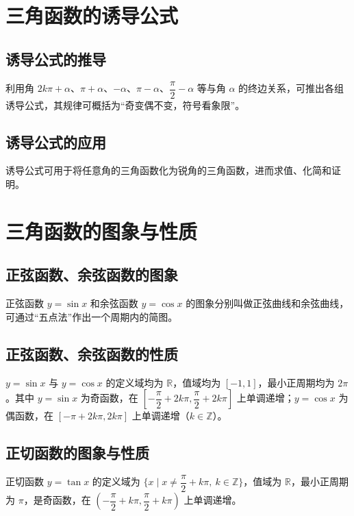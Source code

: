 \documentclass[lang=cn,newtx,10pt,scheme=chinese,nofont]{elegantbook}
\begin{document}
\section{三角函数的诱导公式}
\subsection{诱导公式的推导}
\begin{definition}[诱导公式]
利用角 $2k\pi+\alpha$、$\pi+\alpha$、$-\alpha$、$\pi-\alpha$、$\dfrac{\pi}{2}-\alpha$ 等与角 $\alpha$ 的终边关系，可推出各组诱导公式，其规律可概括为“奇变偶不变，符号看象限”。
\end{definition}
\subsection{诱导公式的应用}
\begin{definition}[诱导公式的应用]
诱导公式可用于将任意角的三角函数化为锐角的三角函数，进而求值、化简和证明。
\end{definition}

\section{三角函数的图象与性质}
\subsection{正弦函数、余弦函数的图象}
\begin{definition}
正弦函数 $y=\sin x$ 和余弦函数 $y=\cos x$ 的图象分别叫做正弦曲线和余弦曲线，可通过“五点法”作出一个周期内的简图。
\end{definition}
\subsection{正弦函数、余弦函数的性质}
\begin{definition}
$y=\sin x$ 与 $y=\cos x$ 的定义域均为 $\mathbb{R}$，值域均为 $[-1,1]$，最小正周期均为 $2\pi$。其中 $y=\sin x$ 为奇函数，在 $\left[-\dfrac{\pi}{2}+2k\pi,\dfrac{\pi}{2}+2k\pi\right]$ 上单调递增；$y=\cos x$ 为偶函数，在 $[-\pi+2k\pi,2k\pi]$ 上单调递增（$k \in \mathbb{Z}$）。
\end{definition}
\subsection{正切函数的图象与性质}
\begin{definition}[正切函数的图象与性质]
正切函数 $y=\tan x$ 的定义域为 $\{x \mid x \neq \dfrac{\pi}{2}+k\pi,\ k \in \mathbb{Z}\}$，值域为 $\mathbb{R}$，最小正周期为 $\pi$，是奇函数，在 $\left(-\dfrac{\pi}{2}+k\pi,\dfrac{\pi}{2}+k\pi\right)$ 上单调递增。
\end{definition}
\end{document}
